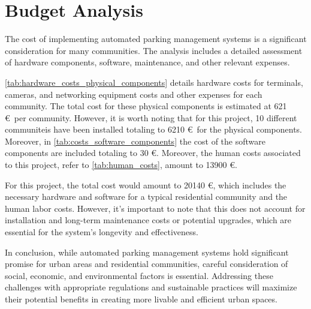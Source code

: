 \section{Budget Analysis}

The cost of implementing automated parking management systems is a significant consideration for many communities. The analysis includes a detailed assessment of hardware components, software, maintenance, and other relevant expenses.

\cref{tab:hardware_costs_physical_components} details hardware costs for terminals, cameras, and networking equipment costs and other expenses for each community. The total cost for these physical components is estimated at 621 \euro\ per community. However, it is worth noting that for this project, 10 different communiteis have been installed totaling to 6210 \euro\ for the physical components. Moreover, in \cref{tab:costs_software_components} the cost of the software components are included totaling to 30 \euro. Moreover, the human costs associated to this project, refer to \cref{tab:human_costs}, amount to 13900 \euro.

For this project, the total cost would amount to 20140 \euro, which includes the necessary hardware and software for a typical residential community and the human labor costs. However, it's important to note that this does not account for installation and long-term maintenance costs or potential upgrades, which are essential for the system's longevity and effectiveness.

In conclusion, while automated parking management systems hold significant promise for urban areas and residential communities, careful consideration of social, economic, and environmental factors is essential. Addressing these challenges with appropriate regulations and sustainable practices will maximize their potential benefits in creating more livable and efficient urban spaces.

